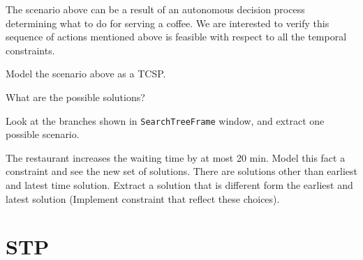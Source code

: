 \documentclass[a4paper]{article}
\begin{document}
The scenario above can be a result of an autonomous decision process determining what to do for serving a coffee. We are interested to verify this sequence of actions mentioned above is feasible with respect to all the temporal constraints. 



{\ex{}\label{ex:ex1}  
Model the scenario above as a TCSP. 
\vspace{0.1cm}}

{\ex{}\label{ex:ex1}  
What are the possible solutions? 
\vspace{0.1cm}}


{\ex{}\label{ex:ex1}  
Look at the branches shown in {\tt SearchTreeFrame} window, and extract one possible scenario.
\vspace{0.1cm}}


{\ex{}\label{ex:ex1}  
The restaurant increases the waiting time by at most 20 min. Model this fact a constraint and see the new set of solutions. There are solutions other than earliest and latest time solution. Extract a solution that is different form the earliest and latest solution (Implement constraint that reflect these choices).


\vspace{0.1cm}}


\section{STP}

%
%
\end{document}
